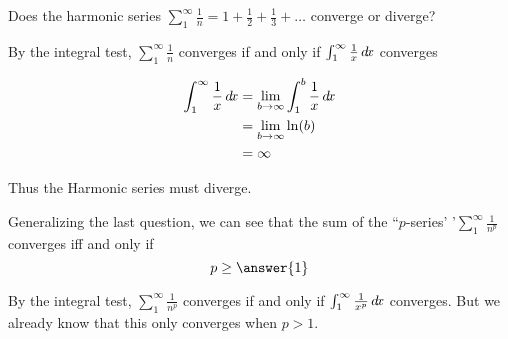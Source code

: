 \documentclass{ximera}
\begin{document}
\begin{question}
	Does the harmonic series $\sum_1^\infty \frac{1}{n} = 1 + \frac{1}{2} + \frac{1}{3}+ \dots$ converge or diverge?
	
	\begin{multipleChoice}
	\end{multipleChoice}
	
	\begin{hint}
		By the integral test, $\sum_1^\infty \frac{1}{n}$ converges if and only if $\int_1^\infty \frac{1}{x} \mathop{}\!d\! x$ converges 
	\end{hint}
	
	\begin{hint}
		\begin{align*}
			\int_1^\infty \frac{1}{x} \mathop{}\!d\! x &= \lim_{b \to \infty} \int_1^b \frac{1}{x} \mathop{}\!d\! x\\
				&=\lim_{b \to \infty} \ln(b) \\
				&=\infty
		\end{align*}
		
		Thus the Harmonic series must diverge.
	\end{hint}
\end{question}

\begin{question}
Generalizing the last question, we can see that the sum of the ``$p$-series' '$\sum_1^\infty \frac{1}{n^p}$ converges iff and only if
\[
p \geq \answer{1}
\]

	\begin{hint}
		By the integral test, $\sum_1^\infty \frac{1}{n^p}$ converges if and only if $\int_1^\infty \frac{1}{x^p} \mathop{}\!d\! x$ converges.  But we already know that this only converges when $p>1$.
	\end{hint}
\end{question}
\end{document}
